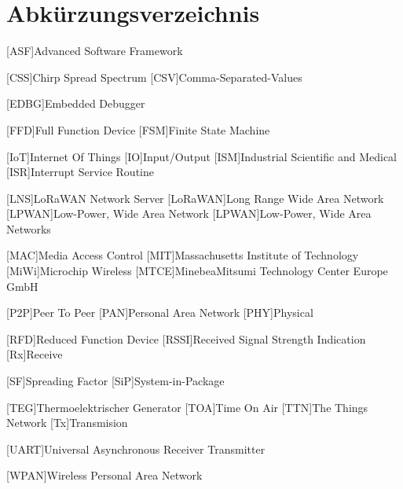 \chapter*{Abkürzungsverzeichnis}

\begin{acronym}[LoRaWAN]

[ASF]{Advanced Software Framework}

[CSS]{Chirp Spread Spectrum}
[CSV]{Comma-Separated-Values}
	
[EDBG]{Embedded Debugger}

[FFD]{Full Function Device}
[FSM]{Finite State Machine}

[IoT]{Internet Of Things}
[IO]{Input/Output}
[ISM]{Industrial Scientific and Medical}
[ISR]{Interrupt Service Routine}

[LNS]{LoRaWAN Network Server}
[LoRaWAN]{Long Range Wide Area Network}
[LPWAN]{Low-Power, Wide Area Network}
[LPWAN]{Low-Power, Wide Area Networks}

[MAC]{Media Access Control}
[MIT]{Massachusetts Institute of Technology}
[MiWi]{Microchip Wireless}
[MTCE]{MinebeaMitsumi Technology Center Europe GmbH}

[P2P]{Peer To Peer}
[PAN]{Personal Area Network}
[PHY]{Physical}

[RFD]{Reduced Function Device}
[RSSI]{Received Signal Strength Indication}
[Rx]{Receive}

[SF]{Spreading Factor} %
[SiP]{System-in-Package}

[TEG]{Thermoelektrischer Generator}
[TOA]{Time On Air}
[TTN]{The Things Network}
[Tx]{Transmision}

[UART]{Universal Asynchronous Receiver Transmitter}

[WPAN]{Wireless Personal Area Network}

\end{acronym}
